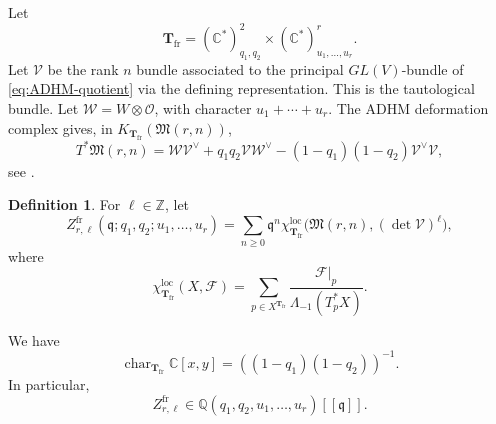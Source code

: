 \documentclass{amsart}
\theoremstyle{definition}
\newtheorem{definition}{Definition}
\numberwithin{equation}{section}
\newcommand{\C}{\mathbb C}
\newcommand{\Q}{\mathbb Q}
\newcommand{\Z}{\mathbb Z}
\newcommand{\cO}{\mathcal O}
\newcommand{\cF}{\mathcal F}
\newcommand{\cV}{\mathcal V}
\newcommand{\cW}{\mathcal W}
\newcommand{\M}{\mathfrak M}
\begin{document}
Let
\[
 \mathbf T_{\mathrm{fr}}=(\C^*)^2_{q_1,q_2}\times
 (\C^*)^r_{u_1,\ldots,u_r}.
\]
Let \(\cV\) be the rank \(n\) bundle associated to the principal \(GL(V)\)-bundle of \eqref{eq:ADHM-quotient} via the defining representation.  This is the tautological bundle.  Let \(\cW=W\otimes\cO\), with character \(u_1+\cdots+u_r\).  The ADHM deformation complex gives, in \(K_{\mathbf T_{\mathrm{fr}}}(\M(r,n))\),
\begin{equation}
 T^*\M(r,n)
 =\cW\cV^\vee+q_1q_2\cV\cW^\vee
 -(1-q_1)(1-q_2)\cV^\vee\cV,
\label{eq:ADHM-tangent}
\end{equation}
see \cite[Section~2]{NakajimaYoshiokaII}.

\begin{definition}\label{def:ADHM-index}
For \(\ell\in\Z\), let
\begin{equation}
 Z_{r,\ell}^{\mathrm{fr}}
 (\mathfrak q;q_1,q_2;u_1,\ldots,u_r)
 =\sum_{n\geq0}\mathfrak q^n
 \chi_{\mathbf T_{\mathrm{fr}}}^{\mathrm{loc}}
 \bigl(\M(r,n),(\det\cV)^\ell\bigr),
\label{eq:ADHM-index}
\end{equation}
where
\begin{equation}
 \chi_{\mathbf T_{\mathrm{fr}}}^{\mathrm{loc}}(X,\cF)
 =\sum_{p\in X^{\mathbf T_{\mathrm{fr}}}}
 \frac{\cF|_p}{\Lambda_{-1}(T_p^*X)}.
\label{eq:localized-Euler-convention}
\end{equation}
\end{definition}

We have
\[
 \operatorname{char}_{\mathbf T_{\mathrm{fr}}}\C[x,y] =((1-q_1)(1-q_2))^{-1}.
\]
In particular,
\[
 Z_{r,\ell}^{\mathrm{fr}}
 \in\Q(q_1,q_2,u_1,\ldots,u_r)[[\mathfrak q]].
\]
\end{document}
